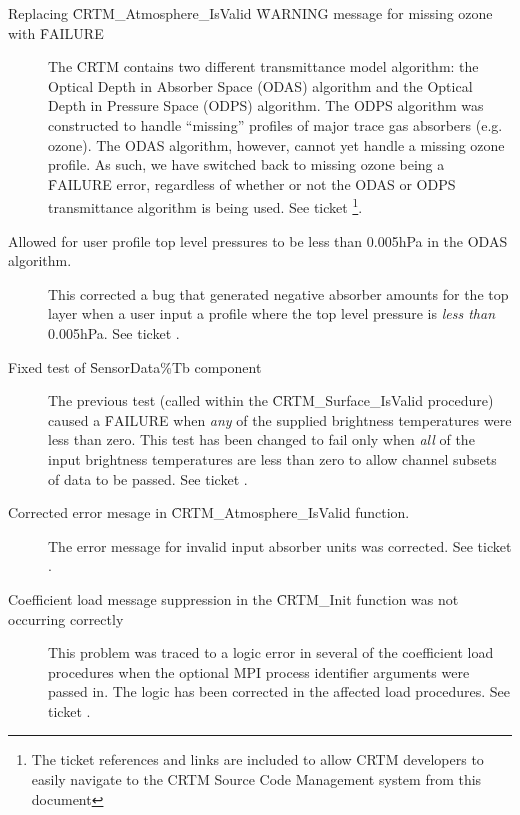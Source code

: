 \begin{description}

\item[Replacing \f{CRTM\_Atmosphere\_IsValid} \f{WARNING} message for missing ozone with \f{FAILURE}] The CRTM contains two different transmittance model algorithm: the Optical Depth in Absorber Space (ODAS) algorithm and the Optical Depth in Pressure Space (ODPS) algorithm. The ODPS algorithm was constructed to handle ``missing'' profiles of major trace gas absorbers (e.g. ozone). The ODAS algorithm, however, cannot yet handle a missing ozone profile. As such, we have switched back to missing ozone being a \f{FAILURE} error, regardless of whether or not the ODAS or ODPS transmittance algorithm is being used. See ticket \footnote{The ticket references and links are included to allow CRTM developers to easily navigate to the CRTM Source Code Management system from this document}.

\item[Allowed for user profile top level pressures to be less than 0.005hPa in the ODAS algorithm.] This corrected a bug that generated negative absorber amounts for the top layer when a user input a profile where the top level pressure is \emph{less than} 0.005hPa. See ticket .

\item[Fixed test of \f{SensorData\%Tb} component] The previous test (called within the \f{CRTM\_Surface\_IsValid} procedure) caused a \f{FAILURE} when \emph{any} of the supplied brightness temperatures were less than zero. This test has been changed to fail only when \emph{all} of the input brightness temperatures are less than zero to allow channel subsets of data to be passed. See ticket .

\item[Corrected error mesage in \f{CRTM\_Atmosphere\_IsValid} function.] The error message for invalid input absorber units was corrected. See ticket .

\item[Coefficient load message suppression in the \f{CRTM\_Init} function was not occurring correctly] This problem was traced to a logic error in several of the coefficient load procedures when the optional MPI process identifier arguments were passed in. The logic has been corrected in the affected load procedures. See ticket .

\end{description}


